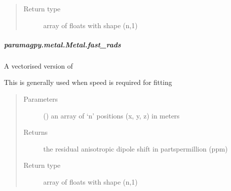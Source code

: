 \documentclass[a4paper,10pt,english,openany,oneside]{sphinxmanual}
\begin{document}
\begin{fulllineitems}
\begin{fulllineitems}
\begin{fulllineitems}
\begin{quote}
\begin{description}
\item[{Return type}] \leavevmode
\sphinxAtStartPar
array of floats with shape (n,1)

\end{description}\end{quote}

\end{fulllineitems}



\subparagraph{paramagpy.metal.Metal.fast\_rads}
\label{\detokenize{reference/generated/paramagpy.metal.Metal.fast_rads:paramagpy-metal-metal-fast-rads}}\label{\detokenize{reference/generated/paramagpy.metal.Metal.fast_rads::doc}}

\begin{fulllineitems}
\label{\detokenize{reference/generated/paramagpy.metal.Metal.fast_rads:paramagpy.metal.Metal.fast_rads}}
\sphinxAtStartPar
A vectorised version of {\hyperref[\detokenize{reference/generated/paramagpy.metal.Metal.rads:paramagpy.metal.Metal.rads}]{}}

\sphinxAtStartPar
This is generally used when speed is required for fitting
\begin{quote}\begin{description}
\item[{Parameters}] \leavevmode
\sphinxAtStartPar
{} (\sphinxstyleliteralemphasis{\sphinxupquote{ (}}\sphinxstyleliteralemphasis{\sphinxupquote{,}}\sphinxstyleliteralemphasis{\sphinxupquote{)}}) \textendash{} an array of ‘n’ positions (x, y, z) in meters

\item[{Returns}] \leavevmode
\sphinxAtStartPar
{} \textendash{} the residual anisotropic dipole shift in parts\sphinxhyphen{}per\sphinxhyphen{}million (ppm)

\item[{Return type}] \leavevmode
\sphinxAtStartPar
array of floats with shape (n,1)

\end{description}\end{quote}


\end{fulllineitems}
\end{fulllineitems}
\end{fulllineitems}
\end{document}
